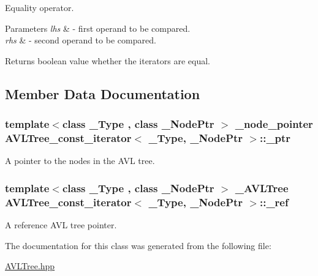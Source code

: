 Equality operator. 


\begin{DoxyParams}{Parameters}
{\em lhs} & -\/ first operand to be compared. \\
\hline
{\em rhs} & -\/ second operand to be compared. \\
\hline
\end{DoxyParams}
\begin{DoxyReturn}{Returns}
boolean value whether the iterators are equal. 
\end{DoxyReturn}


\subsection{Member Data Documentation}
\hypertarget{class_a_v_l_tree__const__iterator_ad8477a42408fd130992d2cfcb42dcb5d}{}
\subsubsection[{\+\_\+ptr}]{\setlength{\rightskip}{0pt plus 5cm}template$<$class \+\_\+\+Type , class \+\_\+\+Node\+Ptr $>$ \+\_\+node\+\_\+pointer {\bf A\+V\+L\+Tree\+\_\+const\+\_\+iterator}$<$ \+\_\+\+Type, \+\_\+\+Node\+Ptr $>$\+::\+\_\+ptr}\label{class_a_v_l_tree__const__iterator_ad8477a42408fd130992d2cfcb42dcb5d}


A pointer to the nodes in the A\+V\+L tree. 

\hypertarget{class_a_v_l_tree__const__iterator_ad7a12b75802e659f5991bcf31cbf8acb}{}
\subsubsection[{\+\_\+ref}]{\setlength{\rightskip}{0pt plus 5cm}template$<$class \+\_\+\+Type , class \+\_\+\+Node\+Ptr $>$ \+\_\+\+A\+V\+L\+Tree {\bf A\+V\+L\+Tree\+\_\+const\+\_\+iterator}$<$ \+\_\+\+Type, \+\_\+\+Node\+Ptr $>$\+::\+\_\+ref}\label{class_a_v_l_tree__const__iterator_ad7a12b75802e659f5991bcf31cbf8acb}


A reference A\+V\+L tree pointer. 



The documentation for this class was generated from the following file\+:\begin{DoxyCompactItemize}
\item 
\hyperlink{_a_v_l_tree_8hpp}{A\+V\+L\+Tree.\+hpp}\end{DoxyCompactItemize}
